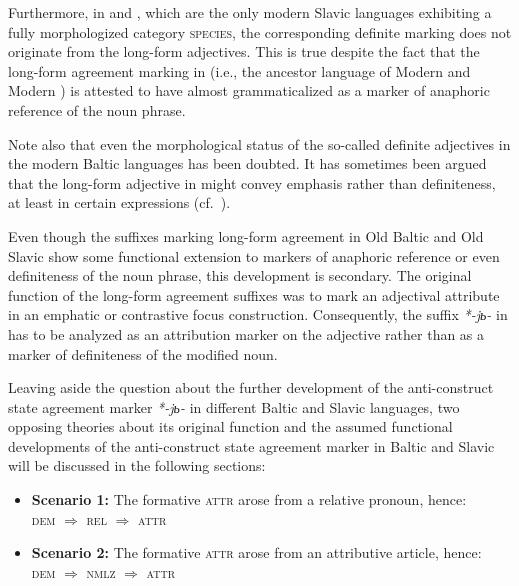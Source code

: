 Furthermore, in  and , which are the only modern Slavic languages exhibiting a fully morphologized category \textsc{species}, the corresponding definite marking does not originate from the long-form adjectives. This is true despite the fact that the long-form agreement marking in  (i.e., the ancestor language of Modern  and Modern ) is attested to have almost grammaticalized as a marker of anaphoric reference of the noun phrase.

Note also that even the morphological status of the so-called definite adjectives in the modern Baltic languages has been doubted. It has sometimes been argued that the long-form adjective in  might convey emphasis rather than definiteness, at least in certain expressions (cf.~\citealt[181–182]{kramsky1972}).

Even though the suffixes marking long-form agreement in Old Baltic and Old Slavic show some functional extension to markers of anaphoric reference or even definiteness of the noun phrase, this development is secondary. The original function of the long-form agreement suffixes was to mark an adjectival attribute in an emphatic or contrastive focus construction. Consequently, the suffix \textit{*-jь-} in  has to be analyzed as an attribution marker on the adjective rather than as a marker of definiteness of the modified noun.

Leaving aside the question about the further development of the anti\hyp{}construct state agreement marker \textit{*-jь-} in different Baltic and Slavic languages, two opposing theories about its original function and the assumed functional developments of the anti\hyp{}construct state agreement marker in Baltic and Slavic will be discussed in the following sections:
\begin{itemize}
\item \textbf{Scenario 1:} The formative \textsc{attr} arose from a relative pronoun, hence:\\
\textsc{dem $\Rightarrow$ rel $\Rightarrow$ attr}
\item \textbf{Scenario 2:} The formative \textsc{attr} arose from an attributive article, hence:\\
\textsc{dem $\Rightarrow$ nmlz $\Rightarrow$ attr}
\label{2paths}
\end{itemize}

